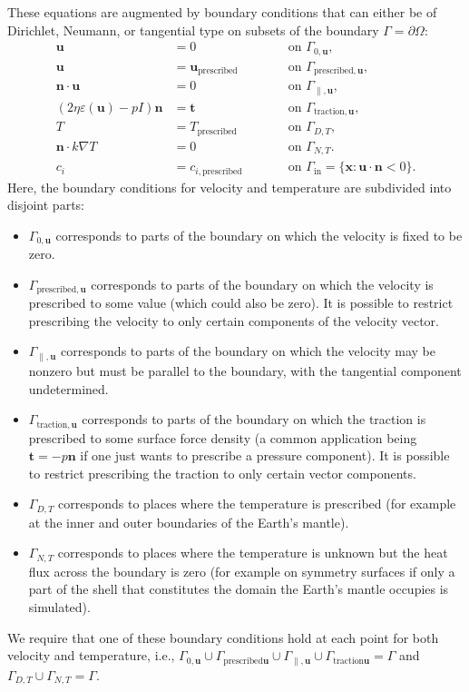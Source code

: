 \documentclass{article}
\begin{document}
These equations are
augmented by boundary conditions that can either be of Dirichlet, Neumann, or
tangential type on subsets of the boundary $\Gamma=\partial\Omega$:
\begin{align}
  \mathbf u &= 0 & \qquad &\textrm{on $\Gamma_{0,\mathbf u}$},
  \\
  \mathbf u &= \mathbf u_{\text{prescribed}} & \qquad &\textrm{on
  $\Gamma_{\text{prescribed},\mathbf u}$},
  \\
  \mathbf n \cdot \mathbf u &= 0 & \qquad &\textrm{on $\Gamma_{\parallel,\mathbf
  u}$},
  \\
  (2\eta \varepsilon(\mathbf u) -p I)\mathbf n  &= \mathbf t & \qquad
  &\textrm{on $\Gamma_{\text{traction},\mathbf u}$},
  \\
  T &= T_{\text{prescribed}}
   & \qquad &\textrm{on $\Gamma_{D,T}$},
  \\
  \mathbf n \cdot k\nabla T &= 0
   & \qquad &\textrm{on $\Gamma_{N,T}$}.
  \\
  \label{eq:gamma-in-composition}
  c_i &= c_{i,\text{prescribed}}
   & \qquad &\textrm{on $\Gamma_{\text{in}}=\{\mathbf x: \mathbf
   u\cdot\mathbf n<0\}$}.
\end{align}
Here, the boundary conditions for velocity and temperature are subdivided into
disjoint parts:
\begin{itemize}
  \item $\Gamma_{0,\mathbf u}$ corresponds to parts of the boundary on
which the velocity is fixed to be zero.
  \item $\Gamma_{\text{prescribed},\mathbf u}$ corresponds to parts of the
  boundary on which the velocity is prescribed to some value (which could also
  be zero). It is possible to restrict prescribing the velocity to only certain
  components of the velocity vector.
  \item $\Gamma_{\parallel,\mathbf u}$ corresponds to parts of the boundary on
  which the velocity may be nonzero but must be parallel to the boundary, with the
tangential component undetermined.
  \item $\Gamma_{\text{traction},\mathbf u}$ corresponds to parts of the
  boundary on which the traction is prescribed to some surface force density (a
  common application being $\mathbf t=-p\mathbf n$ if one
  just wants to prescribe a pressure component). It is possible to restrict
  prescribing the traction to only certain vector components.
  \item $\Gamma_{D,T}$ corresponds to places where the temperature is prescribed
  (for example at the inner and outer boundaries of the Earth's mantle).
  \item $\Gamma_{N,T}$ corresponds to places where the temperature is unknown
  but the heat flux across the boundary is zero (for example on symmetry surfaces if only a part
of the shell that constitutes the domain the Earth's mantle occupies is
simulated).
\end{itemize}
We require that one of these boundary conditions hold at each
point for both velocity and temperature, i.e.,
$\Gamma_{0,\mathbf u}\cup\Gamma_{{\text{prescribed}}\mathbf
  u}\cup\Gamma_{\parallel,\mathbf u}\cup\Gamma_{{\text{traction}}\mathbf
  u}=\Gamma$ and
$\Gamma_{D,T}\cup\Gamma_{N,T}=\Gamma$.
\end{document}

